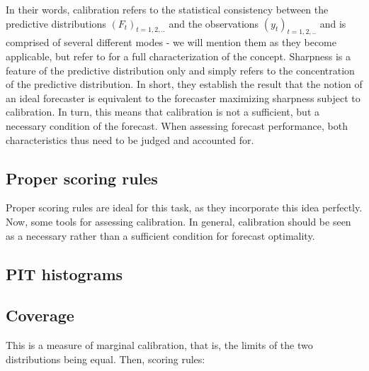 In their words, calibration refers to the statistical consistency between the predictive distributions $(F_t)_{t = 1,2,..}$ and the observations $(y_t)_{t = 1,2,..}$ and is comprised of several different modes - we will mention them as they become applicable, but refer to \cite{gneiting_probabilistic_2007} for a full characterization of the concept. %
Sharpness is a feature of the predictive distribution only and simply refers to the concentration of the predictive distribution. In short, they establish the result that the notion of an ideal forecaster is equivalent to the forecaster maximizing sharpness subject to calibration. In turn, this means that calibration is not a sufficient, but a necessary condition of the forecast. When assessing forecast performance, both characteristics thus need to be judged and accounted for.\\
\subsection{Proper scoring rules}
Proper scoring rules are ideal for this task, as they incorporate this idea perfectly.\\
Now, some tools for assessing calibration. In general, calibration should be seen as a necessary rather than a sufficient condition for forecast optimality.
\subsection{PIT histograms}
\subsection{Coverage}
This is a measure of marginal calibration, that is, the limits of the two distributions being equal.
Then, scoring rules:\\
